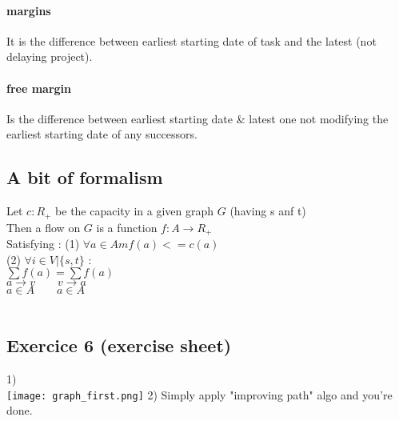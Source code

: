 \documentclass[a4paper,11pt]{article}
\begin{document}
\paragraph{margins} \hfill \break
It is the difference between earliest starting date of task and the latest (not delaying project).

\paragraph{free margin} \hfill \break
Is the difference between earliest starting date \& latest one not modifying the earliest starting date of any successors.\\

\subsection{A bit of formalism}

Let $ c : R_+$ be the capacity in a given graph $G$  (having s anf t)\\
Then a flow on $G$ is a function $f:A \rightarrow R_+$\\
Satisfying :
(1) $\forall a \in A m f(a) <=  c(a) $\\
(2) $\forall i \in V|\{s,t\}$ :\\
$\sum f(a) = \sum f(a)$\\
$a \rightarrow v \quad \quad v \rightarrow a$\\
$ a \in A \quad \quad a \in A$\\
\\

\subsection{Exercice 6 (exercise sheet)}
1)\\
\texttt{[image: graph\_first.png]}
2)
Simply apply "improving path" algo and you're done.
\end{document}
